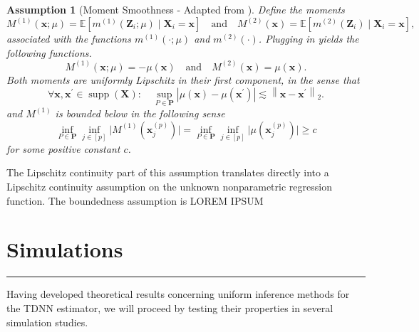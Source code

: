 \documentclass[letterpaper,10pt]{article}
\numberwithin{equation}{section}
\numberwithin{thm}{section}
\newtheorem{asm}{Assumption}
\newcommand{\1}{\mathbb{1}}
\begin{document}
\vspace{0.5cm}
\begin{asm}[Moment Smoothness - Adapted from \citet{ritzwoller_uniform_2024}]
	Define the moments
	\begin{equation}
		M^{(1)}(\mathbf{x} ; \mu)
		= \mathbb{E}\left[m^{(1)}\left(\mathbf{Z}_i ; \mu\right) \mid \mathbf{X}_i= \mathbf{x}\right]
		\quad \text{and} \quad
		M^{(2)}(\mathbf{x})
		= \mathbb{E}\left[m^{(2)}\left(\mathbf{Z}_i\right) \mid \mathbf{X}_i = \mathbf{x}\right],
	\end{equation}
	associated with the functions $m^{(1)}(\cdot ; \mu)$ and $m^{(2)}(\cdot)$.
	Plugging in yields the following functions.
	\begin{equation}
		M^{(1)}(\mathbf{x} ; \mu)
		= -\mu(\mathbf{x})
		\quad \text{and} \quad
		M^{(2)}(\mathbf{x})
		= \mu(\mathbf{x}).
	\end{equation}
	Both moments are uniformly Lipschitz in their first component, in the sense that
	\begin{equation}
		\forall \mathbf{x}, \mathbf{x}^{\prime} \in \operatorname{supp}\left(\mathbf{X}\right): \quad
		\sup _{P \in \mathbf{P}}
		\left|\mu(\mathbf{x})-\mu\left(\mathbf{x}^{\prime}\right)\right|
		\lesssim\left\|\mathbf{x}-\mathbf{x}^{\prime}\right\|_{2}.
	\end{equation}
	and $M^{(1)}$ is bounded below in the following sense
	\begin{equation}
		\inf_{P \in \mathbf{P}} \inf_{j \in [p]} \Big|M^{(1)}\left(\mathbf{x}^{(p)}_{j}\right) \Big|
		= \inf_{P \in \mathbf{P}} \inf_{j \in [p]} \Big|\mu\left(\mathbf{x}^{(p)}_{j}\right) \Big| \geq c
	\end{equation}
	for some positive constant $c$.
\end{asm}

The Lipschitz continuity part of this assumption translates directly into a Lipschitz continuity assumption on the unknown nonparametric regression function.
The boundedness assumption is
	{\color{red} LOREM IPSUM}

\newpage
\section{Simulations}\label{Simulations}
\hrule

Having developed theoretical results concerning uniform inference methods for the TDNN estimator, we will proceed by testing their properties in several simulation studies.
\end{document}

